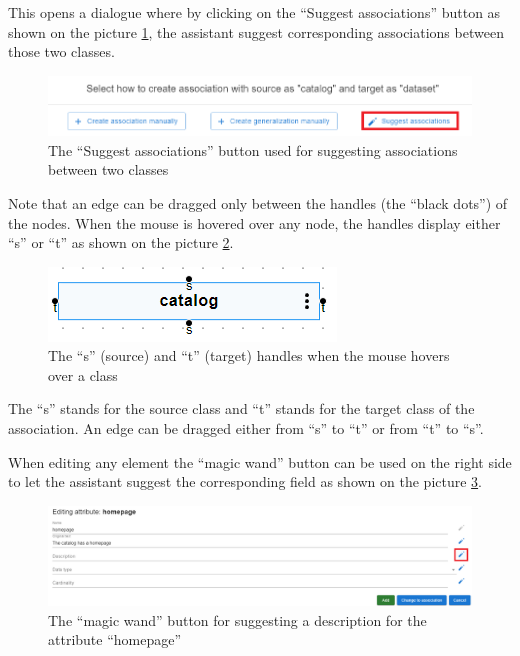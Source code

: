 This opens a dialogue where by clicking on the ``Suggest associations'' button as shown on the picture \ref{fig:suggest_associations_2}, the assistant suggest corresponding associations between those two classes.

\begin{figure}[!h]
    \includegraphics[scale=0.4]{../docs/images/frontend/suggest-associations-2.png}
    \caption{\centering The ``Suggest associations'' button used for suggesting associations between two classes}
    \label{fig:suggest_associations_2}
\end{figure}

Note that an edge can be dragged only between the handles (the ``black dots'') of the nodes. When the mouse is hovered over any node, the handles display either ``s'' or ``t'' as shown on the picture \ref{fig:handles}.

\begin{figure}[!h]
    \includegraphics[scale=0.5]{../docs/images/frontend/handles.png}
    \caption{\centering The ``s'' (source) and ``t'' (target) handles when the mouse hovers over a class}
    \label{fig:handles}
\end{figure}

The ``s'' stands for the source class and ``t'' stands for the target class of the association. An edge can be dragged either from ``s'' to ``t'' or from ``t'' to ``s''.

When editing any element the ``magic wand'' button can be used on the right side to let the assistant suggest the corresponding field as shown on the picture \ref{fig:suggest_single_field}.

\begin{figure}[!h]
    \includegraphics[scale=0.35]{../docs/images/frontend/suggest-single-field.png}
    \caption{\centering The ``magic wand'' button for suggesting a description for the attribute ``homepage''}
    \label{fig:suggest_single_field}
\end{figure}

